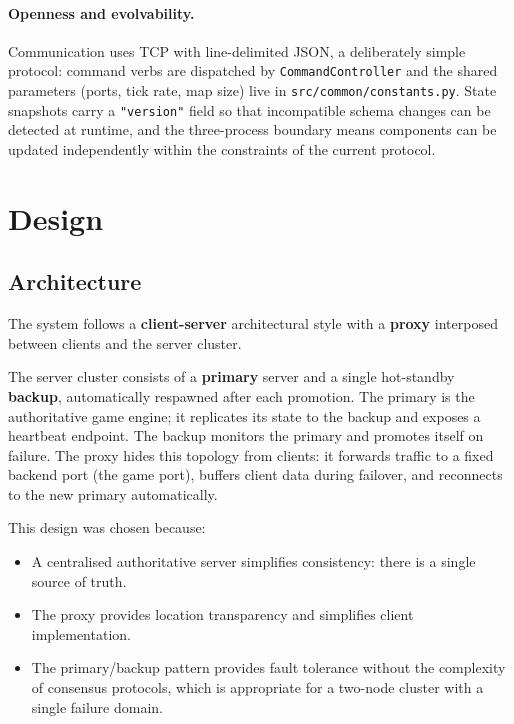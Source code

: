 \documentclass{scrartcl}
\begin{document}
\paragraph{Openness and evolvability.}
Communication uses TCP with line-delimited JSON, a deliberately simple protocol:
command verbs are dispatched by \texttt{CommandController} and the shared
parameters (ports, tick rate, map size) live in \texttt{src/common/constants.py}.
State snapshots carry a \texttt{"version"} field so that incompatible schema changes can be detected at runtime, and the three-process boundary means components can be updated independently within the constraints of the current protocol.

\section{Design}\label{design}

\subsection{Architecture}\label{architecture}

The system follows a \textbf{client-server} architectural style with a \textbf{proxy} interposed between clients and the server cluster.

The server cluster consists of a \textbf{primary} server and a single hot-standby \textbf{backup}, automatically respawned after each promotion.
The primary is the authoritative game engine; it replicates its state to the backup and exposes a heartbeat endpoint.
The backup monitors the primary and promotes itself on failure.
The proxy hides this topology from clients: it forwards traffic to a fixed backend port (the game port), buffers client data during failover, and reconnects to the new primary automatically.

This design was chosen because:
\begin{itemize}
    \item A centralised authoritative server simplifies consistency: there is a single source of truth.
    \item The proxy provides location transparency and simplifies client implementation.
    \item The primary/backup pattern provides fault tolerance without the complexity of consensus protocols, which is appropriate for a two-node cluster with a single failure domain.
\end{itemize}
\end{document}
